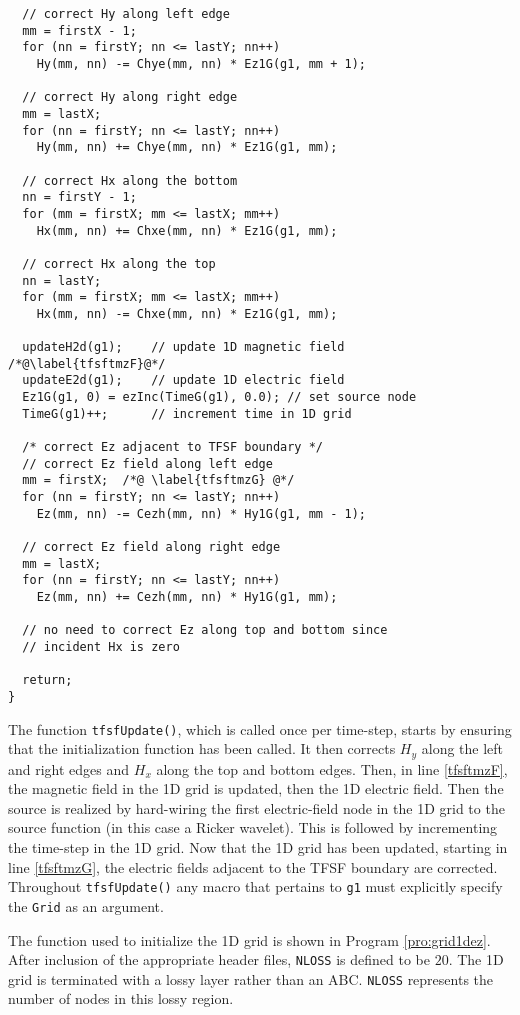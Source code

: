 \begin{program}
\begin{lstlisting}
  // correct Hy along left edge
  mm = firstX - 1;
  for (nn = firstY; nn <= lastY; nn++)
    Hy(mm, nn) -= Chye(mm, nn) * Ez1G(g1, mm + 1);
  
  // correct Hy along right edge
  mm = lastX;
  for (nn = firstY; nn <= lastY; nn++)
    Hy(mm, nn) += Chye(mm, nn) * Ez1G(g1, mm);

  // correct Hx along the bottom
  nn = firstY - 1;
  for (mm = firstX; mm <= lastX; mm++)
    Hx(mm, nn) += Chxe(mm, nn) * Ez1G(g1, mm);

  // correct Hx along the top
  nn = lastY;
  for (mm = firstX; mm <= lastX; mm++)
    Hx(mm, nn) -= Chxe(mm, nn) * Ez1G(g1, mm);

  updateH2d(g1);    // update 1D magnetic field  /*@\label{tfsftmzF}@*/
  updateE2d(g1);    // update 1D electric field
  Ez1G(g1, 0) = ezInc(TimeG(g1), 0.0); // set source node
  TimeG(g1)++;      // increment time in 1D grid

  /* correct Ez adjacent to TFSF boundary */
  // correct Ez field along left edge
  mm = firstX;  /*@ \label{tfsftmzG} @*/
  for (nn = firstY; nn <= lastY; nn++)
    Ez(mm, nn) -= Cezh(mm, nn) * Hy1G(g1, mm - 1);
  
  // correct Ez field along right edge
  mm = lastX;
  for (nn = firstY; nn <= lastY; nn++)
    Ez(mm, nn) += Cezh(mm, nn) * Hy1G(g1, mm);
  
  // no need to correct Ez along top and bottom since
  // incident Hx is zero

  return;
}
\end{lstlisting}
\end{program}

The function {\tt tfsfUpdate()}, which is called once per time-step,
starts by ensuring that the initialization function has been called.
It then corrects $H_y$ along the left and right edges and $H_x$ along
the top and bottom edges.  Then, in line \ref{tfsftmzF}, the magnetic
field in the 1D grid is updated, then the 1D electric field.  Then the
source is realized by hard-wiring the first electric-field node in the
1D grid to the source function (in this case a Ricker wavelet).  This
is followed by incrementing the time-step in the 1D grid.  Now that
the 1D grid has been updated, starting in line \ref{tfsftmzG}, the
electric fields adjacent to the TFSF boundary are corrected.
Throughout {\tt tfsfUpdate()} any macro that pertains to {\tt g1} must
explicitly specify the {\tt Grid} as an argument.

The function used to initialize the 1D grid is shown in Program
\ref{pro:grid1dez}.  After inclusion of the appropriate header files, 
{\tt NLOSS} is defined to be $20$.  The 1D grid is terminated with a
lossy layer rather than an ABC\@.  {\tt NLOSS} represents the number of
nodes in this lossy region.


